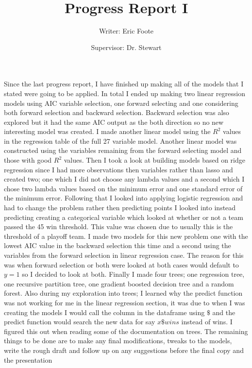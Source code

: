 \documentclass{article}
\begin{document}
	\title{Progress Report I}
	\author{Writer: Eric Foote}
	\maketitle
	\author{Supervisor: Dr. Stewart}
	\newpage
	
Since the last progress report, I have finished up making all of the models that I stated were going to be applied. In total I ended up making two linear regression  models using AIC variable selection, one forward selecting and one considering both forward selection and backward selection. Backward selection was also explored but it had the same AIC output as the both direction so no new interesting model was created. I made another linear model using the $R^2$ values in the regression table of the full 27 variable model. Another linear model was constructed using the variables remaining from the forward selecting model and those with good $R^2$ values. Then I took a look at building models based on ridge regression since I had more observations then variables rather than lasso and created two; one which I did not choose any lambda values and a second which I chose two lambda values based on the minimum error and one standard error of the minimum error. Following that I looked into applying logistic regression and had to change the problem rather then predicting points I looked into instead predicting creating a categorical variable which looked at whether or not a team passed the 45 win threshold. This value was chosen due to usually this is the threshold of a playoff team. I made two models for this new problem one with the lowest AIC value in the backward selection this time and a second using the variables from the forward selection in linear regression case. The reason for this was when forward selection or both were looked at both cases would default to $y = 1$ so I decided to look at both. Finally I made four trees; one regression tree, one recursive partition tree, one gradient boosted decision tree and a random forest.    Also during my exploration into trees; I learned why the predict function was not working for me in the linear regression section, it was due to when I was creating the models I would call the column in the dataframe using $\$$ and the predict function would search the new data for say $x\$wins$ instead of wins. I figured this out when reading some of the documentation on trees.
\newline\newline
The remaining things to be done are to make any final modifications, tweaks to the models, write the rough draft and follow up on any suggestions before the final copy and the presentation 
\end{document}
